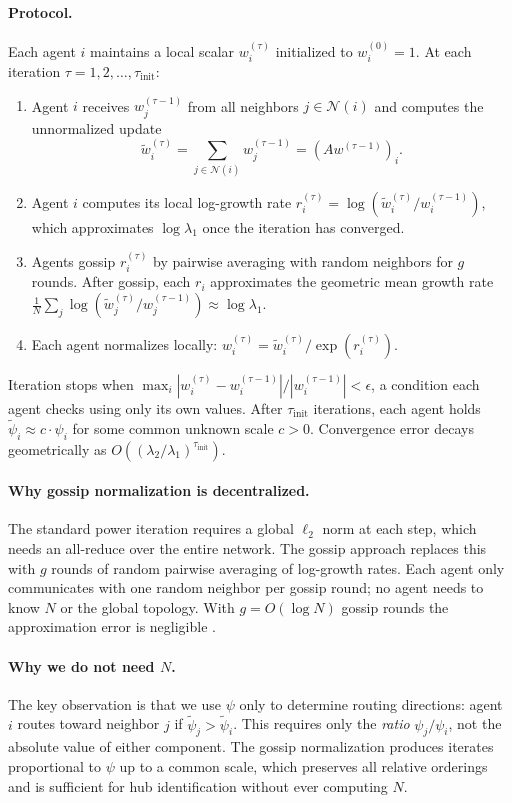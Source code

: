 \documentclass{article}
\begin{document}
\paragraph{Protocol.}
Each agent $i$ maintains a local scalar $w_i^{(\tau)}$ initialized to $w_i^{(0)} = 1$. At each iteration $\tau = 1, 2, \ldots, \tau_{\mathrm{init}}$:
\begin{enumerate}
    \item Agent $i$ receives $w_j^{(\tau-1)}$ from all neighbors $j \in \mathcal{N}(i)$ and computes the unnormalized update
    \[
        \tilde{w}_i^{(\tau)} = \sum_{j \in \mathcal{N}(i)} w_j^{(\tau-1)} = (Aw^{(\tau-1)})_i.
    \]
    \item Agent $i$ computes its local log-growth rate $r_i^{(\tau)} = \log(\tilde{w}_i^{(\tau)} / w_i^{(\tau-1)})$, which approximates $\log \lambda_1$ once the iteration has converged.
    \item Agents gossip $r_i^{(\tau)}$ by pairwise averaging with random neighbors for $g$ rounds. After gossip, each $r_i$ approximates the geometric mean growth rate $\frac{1}{N}\sum_j \log(\tilde{w}_j^{(\tau)} / w_j^{(\tau-1)}) \approx \log \lambda_1$.
    \item Each agent normalizes locally: $w_i^{(\tau)} = \tilde{w}_i^{(\tau)} / \exp(r_i^{(\tau)})$.
\end{enumerate}
Iteration stops when $\max_i |w_i^{(\tau)} - w_i^{(\tau-1)}| / |w_i^{(\tau-1)}| < \epsilon$, a condition each agent checks using only its own values. After $\tau_{\mathrm{init}}$ iterations, each agent holds $\tilde{\psi}_i \approx c \cdot \psi_i$ for some common unknown scale $c > 0$. Convergence error decays geometrically as $O\!\left((\lambda_2/\lambda_1)^{\tau_{\mathrm{init}}}\right)$.

\paragraph{Why gossip normalization is decentralized.}
The standard power iteration requires a global $\ell_2$ norm at each step, which needs an all-reduce over the entire network. The gossip approach replaces this with $g$ rounds of random pairwise averaging of log-growth rates. Each agent only communicates with one random neighbor per gossip round; no agent needs to know $N$ or the global topology. With $g = O(\log N)$ gossip rounds the approximation error is negligible \cite{jelasity2007asynchronous}.

\paragraph{Why we do not need $N$.}
The key observation is that we use $\psi$ only to determine routing directions: agent $i$ routes toward neighbor $j$ if $\tilde{\psi}_j > \tilde{\psi}_i$. This requires only the \emph{ratio} $\psi_j / \psi_i$, not the absolute value of either component. The gossip normalization produces iterates proportional to $\psi$ up to a common scale, which preserves all relative orderings and is sufficient for hub identification without ever computing $N$.
\end{document}
